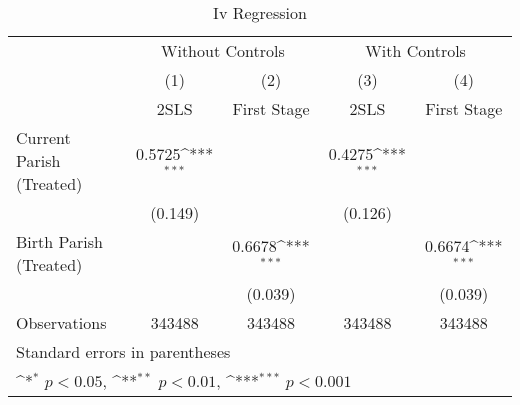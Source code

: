 \begin{table}[htbp]\centering
\def\sym#1{\ifmmode^{#1}\else\(^{#1}\)\fi}
\caption{Iv Regression \label{columns}}
\begin{tabular}{l*{4}{c}}
\hline\hline
                    &\multicolumn{2}{c}{Without Controls}       &\multicolumn{2}{c}{With Controls}          \\\cmidrule(lr){2-3}\cmidrule(lr){4-5}
                    &\multicolumn{1}{c}{(1)}&\multicolumn{1}{c}{(2)}&\multicolumn{1}{c}{(3)}&\multicolumn{1}{c}{(4)}\\
                    &\multicolumn{1}{c}{2SLS}&\multicolumn{1}{c}{First Stage}&\multicolumn{1}{c}{2SLS}&\multicolumn{1}{c}{First Stage}\\
\hline
Current Parish (Treated)&      0.5725\sym{***}&                     &      0.4275\sym{***}&                     \\
                    &     (0.149)         &                     &     (0.126)         &                     \\
[1em]
Birth Parish (Treated)&                     &      0.6678\sym{***}&                     &      0.6674\sym{***}\\
                    &                     &     (0.039)         &                     &     (0.039)         \\

\hline
Observations        &      343488         &      343488         &      343488         &      343488         \\
\hline\hline
\multicolumn{5}{l}{\footnotesize Standard errors in parentheses}\\
\multicolumn{5}{l}{\footnotesize \sym{*} \(p<0.05\), \sym{**} \(p<0.01\), \sym{***} \(p<0.001\)}\\
\end{tabular}
\end{table}
